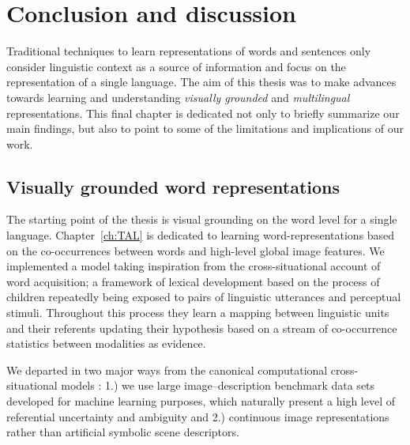 \chapter{Conclusion and discussion}
\label{ch:conclusion}

Traditional techniques to learn representations of words and sentences only consider 
linguistic context as a source of information and focus on the representation of a single language.
The aim of this thesis was to make advances towards learning 
and understanding \emph{visually grounded} and \emph{multilingual} representations. 
This final chapter is dedicated not only to briefly summarize our main findings, but also to 
point to some of the limitations and implications of our work.


\section{Visually grounded word representations}
The starting point of the thesis is visual grounding on the word level for a single language.
Chapter~\ref{ch:TAL} is dedicated to learning word-representations based on the co-occurrences between 
words and high-level global image features. We implemented a model taking inspiration from
the cross-situational account of word acquisition; a framework of lexical development
based on the process of children repeatedly being exposed to pairs of linguistic utterances and 
perceptual stimuli.  Throughout this process they learn a mapping between linguistic 
units and their referents updating their hypothesis based on a stream of co-occurrence statistics
between modalities as evidence. 


We departed in two major ways from the canonical computational cross-situational models 
 \citep{siskind.96,fontanari2009cross,fazly.etal.10,kachergis2012associative,matusevych2013automatic,yu2013grounded}: 
1.) we use large image--description benchmark data sets developed for machine learning purposes, 
which naturally present a high level of referential uncertainty and ambiguity and
2.) continuous image representations rather than artificial symbolic scene descriptors.

